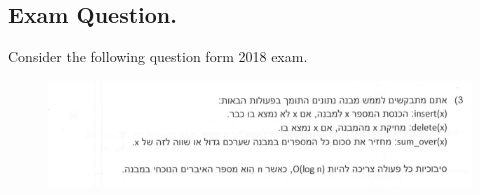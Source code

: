 \newpage
\fi
\subsection{Exam Question.}
Consider the following question form 2018 exam. 
\begin{figure}[h]
  \centering
  \includegraphics[scale=0.8]{avl-q-exam.png}\\
\end{figure}



